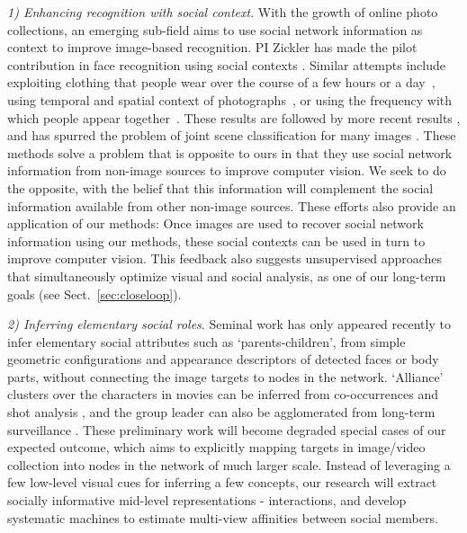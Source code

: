 \emph{1) Enhancing recognition with social context}. With the growth of online photo collections, an emerging sub-field aims to use social network information as context to improve image-based recognition. PI Zickler has made the pilot contribution in face recognition using social contexts \cite{Stone2008,Stone2010}. Similar attempts include exploiting clothing that people wear over the course of a few hours or a day~\cite{anguelov2007cir, zhang2003aah,  song2006cah, sivic2006fpr}, using temporal and spatial context of photographs~\cite{naaman2005lcr, zhao2006apa}, or using the frequency with which people appear together~\cite{anguelov2007cir}. These results are followed by more recent results \cite{Dikmen:classify,LeeBMVC2011,Poppe2012}, and has spurred the problem of joint scene classification for many images \cite{McAuley:socialclassify}. These methods solve a problem that is opposite to ours in that they use social network information from non-image sources to improve computer vision. We seek to do the opposite, with the belief that this information will complement the social information available from other non-image sources. These efforts also provide an application of our methods: Once images are used to recover social network information using our methods, these social contexts can be used in turn to improve computer vision. This feedback also suggests unsupervised approaches that simultaneously optimize visual and social analysis, as one of our long-term goals (see Sect.~\ref{sec:closeloop}).


\emph{2) Inferring elementary social roles}. Seminal work has only appeared recently to infer elementary social attributes such as `parents-children', from simple geometric configurations and appearance descriptors of detected faces or body parts\cite{Gallagher,Wang2010,Murillo2012}, without connecting the image targets to nodes in the network. `Alliance' clusters over the characters in movies can be inferred from co-occurrences and shot analysis \cite{Ding2010,Ding2011}, and the group leader can also be agglomerated from long-term surveillance \cite{Yu2009,Zhang2011}. These preliminary work will become degraded special cases of our expected outcome, which aims to explicitly mapping targets in image/video collection into nodes in the network of much larger scale. Instead of leveraging a few low-level visual cues for inferring a few concepts, our research will extract socially informative mid-level representations - interactions, and develop systematic machines to estimate multi-view affinities between social members.


